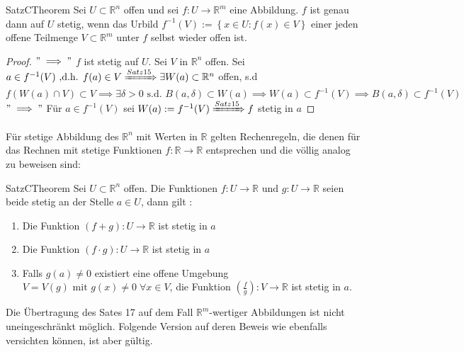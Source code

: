 \documentclass[11.5 pt, a4paper]{memoir}
\begin{document}
\begin{ibox}[16]{Satz}{CTheorem}
    Sei $ U \subset  \mathbb{R}^n  $ offen und sei $ f: U \to \mathbb{R}^m $ eine Abbildung. $ f $ ist genau dann auf $ U  $ stetig,
	wenn das Urbild $ f^{-1}(V) := \left\{ x \in U : f(x) \in V \right\}  $ einer jeden offene Teilmenge $ V \subset  \mathbb{R}^m $ unter
	$ f $ selbst wieder offen ist.
\end{ibox}

\begin{proof}
	$ " \implies" $ $ f $ ist stetig auf $ U $. Sei $ V  $ in $ \mathbb{R}^n  $ offen. Sei $ a \in  f^{-1}(V) \text{ ,d.h. } f(a) 
	\in  V  \xRightarrow{Satz 15} \exists W(a) \subset  \mathbb{R}^n $ offen, s.d $ f(W(a) \cap V) \subset  V \implies  \exists \delta
> 0 \text{ s.d. } B(a, \delta) \subset  W(a) \implies  W(a) \subset  f^{-1}(V) \implies  B(a, \delta) \subset  f^{-1}(V)$ \\
$ " \implies " $ Für $ a \in f^{-1}(V) $ sei $ W(a) := f^{-1}(V) \xRightarrow{Satz 15} f $ stetig in $ a $  
\end{proof}


Für stetige Abbildung des $ \mathbb{R}^n  $ mit Werten in $ \mathbb{R}  $ 
gelten Rechenregeln, die denen für das Rechnen mit stetige Funktionen $ f: \mathbb{R}  \to \mathbb{R}  $ entsprechen und die völlig
analog zu beweisen sind:

\begin{ibox}[17]{Satz}{CTheorem}
    Sei $ U \subset \mathbb{R}^n  $ offen. Die Funktionen $ f : U \to \mathbb{R} \text{ und } g : U \to \mathbb{R}  $ seien beide 
	stetig an der Stelle $ a \in  U $, dann gilt :
	\begin{enumerate}[label=\alph*)]
		\item Die Funktion $ (f+g):U \to \mathbb{R}  $ ist stetig in $ a $ 
		\item Die Funktion $ (f \cdot g) : U \to \mathbb{R}  $ ist stetig in $ a $ 
		\item Falls $ g(a) \neq 0 $ existiert eine offene Umgebung $ V = V(g) \text{ mit } g(x) \neq 0 \; \forall x \in  V $,
			die Funktion $ \left( \frac{f}{g}\right) : V \to \mathbb{R}    $ ist stetig in $ a $.  
	\end{enumerate}
	
\end{ibox}

Die Übertragung des Sates 17 auf dem Fall $ \mathbb{R}^m  $-wertiger Abbildungen ist nicht uneingeschränkt möglich. Folgende Version auf 
deren Beweis wie ebenfalls versichten können, ist aber gültig. 
\end{document}
